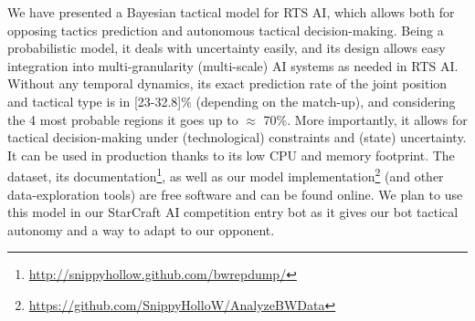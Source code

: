 We have presented a Bayesian tactical model for RTS AI, which allows both for opposing tactics prediction and autonomous tactical decision-making. Being a probabilistic model, it deals with uncertainty easily, and its design allows easy integration into multi-granularity (multi-scale) AI systems as needed in RTS AI. Without any temporal dynamics, its exact prediction rate of the joint position and tactical type is in [23-32.8]\% (depending on the match-up), and considering the 4 most probable regions it goes up to $\approx$ 70\%. More importantly, it allows for tactical decision-making under (technological) constraints and (state) uncertainty. It can be used in production thanks to its low CPU and memory footprint. The dataset, its documentation\footnote{\url{http://snippyhollow.github.com/bwrepdump/}}, as well as our model implementation\footnote{\url{https://github.com/SnippyHolloW/AnalyzeBWData}} (and other data-exploration tools) are free software and can be found online. We plan to use this model in our StarCraft AI competition entry bot as it gives our bot tactical autonomy and a way to adapt to our opponent.

